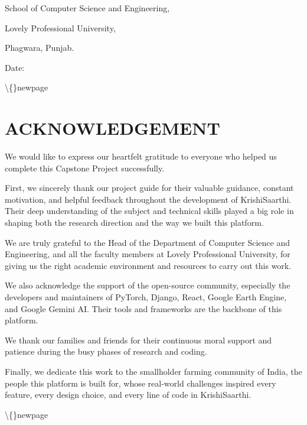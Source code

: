 \documentclass[12pt, a4paper]{report}
\begin{document}
School of Computer Science and Engineering,

Lovely Professional University,

Phagwara, Punjab.

Date:

\textbackslash\{\}newpage

\section{ACKNOWLEDGEMENT}
We would like to express our heartfelt gratitude to everyone who helped us complete this Capstone Project successfully.

First, we sincerely thank our project guide for their valuable guidance, constant motivation, and helpful feedback throughout the development of KrishiSaarthi. Their deep understanding of the subject and technical skills played a big role in shaping both the research direction and the way we built this platform.

We are truly grateful to the Head of the Department of Computer Science and Engineering, and all the faculty members at Lovely Professional University, for giving us the right academic environment and resources to carry out this work.

We also acknowledge the support of the open-source community, especially the developers and maintainers of PyTorch, Django, React, Google Earth Engine, and Google Gemini AI. Their tools and frameworks are the backbone of this platform.

We thank our families and friends for their continuous moral support and patience during the busy phases of research and coding.

Finally, we dedicate this work to the smallholder farming community of India, the people this platform is built for, whose real-world challenges inspired every feature, every design choice, and every line of code in KrishiSaarthi.

\textbackslash\{\}newpage
\end{document}
